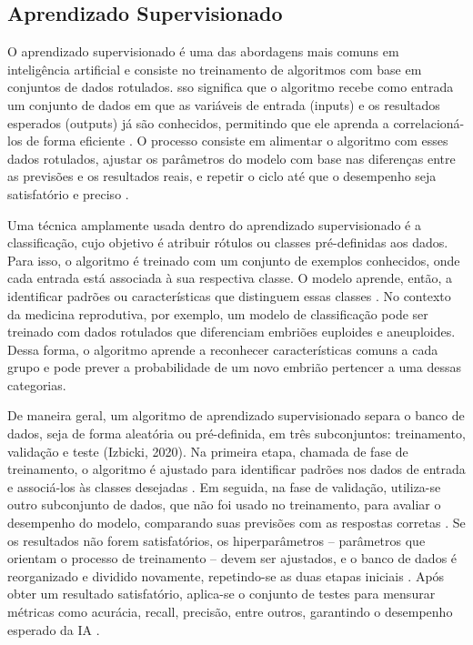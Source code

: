 \subsection{Aprendizado Supervisionado}

O aprendizado supervisionado é uma das abordagens mais comuns em inteligência artificial e consiste no treinamento de algoritmos com base em conjuntos de dados rotulados. sso significa que o algoritmo recebe como entrada um conjunto de dados em que as variáveis de entrada (inputs) e os resultados esperados (outputs) já são conhecidos, permitindo que ele aprenda a correlacioná-los de forma eficiente \cite{russell2016}. O processo consiste em alimentar o algoritmo com esses dados rotulados, ajustar os parâmetros do modelo com base nas diferenças entre as previsões e os resultados reais, e repetir o ciclo até que o desempenho seja satisfatório e preciso \cite{trask2019}. 

Uma técnica amplamente usada dentro do aprendizado supervisionado é a classificação, cujo objetivo é atribuir rótulos ou classes pré-definidas aos dados. Para isso, o algoritmo é treinado com um conjunto de exemplos conhecidos, onde cada entrada está associada à sua respectiva classe. O modelo aprende, então, a identificar padrões ou características que distinguem essas classes \cite{izbicki2020}. No contexto da medicina reprodutiva, por exemplo, um modelo de classificação pode ser treinado com dados rotulados que diferenciam embriões euploides e aneuploides. Dessa forma, o algoritmo aprende a reconhecer características comuns a cada grupo e pode prever a probabilidade de um novo embrião pertencer a uma dessas categorias.

De maneira geral, um algoritmo de aprendizado supervisionado separa o banco de dados, seja de forma aleatória ou pré-definida, em três subconjuntos: treinamento, validação e teste (Izbicki, 2020). Na primeira etapa, chamada de fase de treinamento, o algoritmo é ajustado para identificar padrões nos dados de entrada e associá-los às classes desejadas \cite{izbicki2020}. Em seguida, na fase de validação, utiliza-se outro subconjunto de dados, que não foi usado no treinamento, para avaliar o desempenho do modelo, comparando suas previsões com as respostas corretas \cite{izbicki2020}. Se os resultados não forem satisfatórios, os hiperparâmetros – parâmetros que orientam o processo de treinamento – devem ser ajustados, e o banco de dados é reorganizado e dividido novamente, repetindo-se as duas etapas iniciais \cite{izbicki2020}. Após obter um resultado satisfatório, aplica-se o conjunto de testes para mensurar métricas como acurácia, recall, precisão, entre outros, garantindo o desempenho esperado da IA \cite{izbicki2020}.

